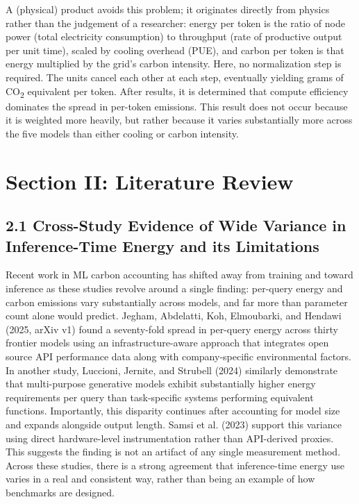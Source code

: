 \documentclass[11pt]{article}
\newcommand{\cotwo}{CO\textsubscript{2}}     %
\begin{document}
A (physical) product avoids this problem; it originates directly from physics rather than the judgement of a researcher: energy per token is the ratio of node power (total electricity consumption) to throughput (rate of productive output per unit time), scaled by cooling overhead (PUE), and carbon per token is that energy multiplied by the grid's carbon intensity. Here, no normalization step is required. The units cancel each other at each step, eventually yielding grams of \cotwo{} equivalent per token. After results, it is determined that compute efficiency dominates the spread in per-token emissions. This result does not occur because it is weighted more heavily, but rather because it varies substantially more across the five models than either cooling or carbon intensity.

\section*{Section II: Literature Review}

\subsection*{2.1 Cross-Study Evidence of Wide Variance in Inference-Time Energy and its Limitations}

Recent work in ML carbon accounting has shifted away from training and toward inference as these studies revolve around a single finding: per-query energy and carbon emissions vary substantially across models, and far more than parameter count alone would predict. Jegham, Abdelatti, Koh, Elmoubarki, and Hendawi (2025, arXiv v1) found a seventy-fold spread in per-query energy across thirty frontier models using an infrastructure-aware approach that integrates open source API performance data along with company-specific environmental factors. In another study, Luccioni, Jernite, and Strubell (2024) similarly demonstrate that multi-purpose generative models exhibit substantially higher energy requirements per query than task-specific systems performing equivalent functions. Importantly, this disparity continues after accounting for model size and expands alongside output length. Samsi et al. (2023) support this variance using direct hardware-level instrumentation rather than API-derived proxies. This suggests the finding is not an artifact of any single measurement method. Across these studies, there is a strong agreement that inference-time energy use varies in a real and consistent way, rather than being an example of how benchmarks are designed.
\end{document}
